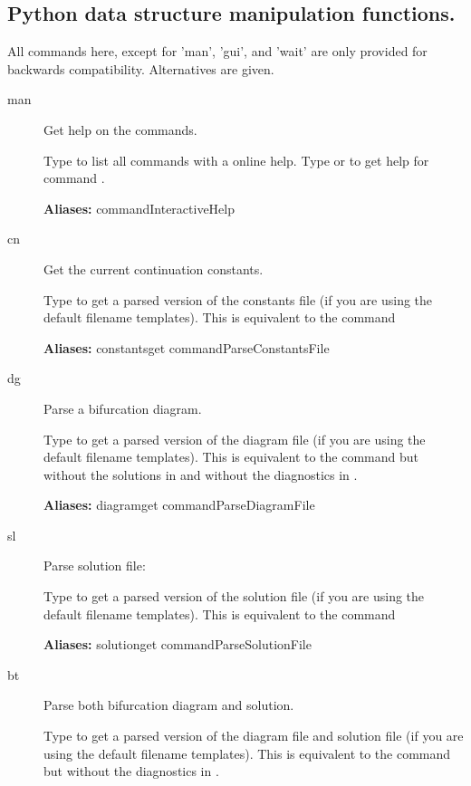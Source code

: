 \documentclass[12pt]{report}
\begin{document}
\subsection{Python data structure manipulation functions.}
\label{sec:clui_ref_python}
All commands here, except for 'man', 'gui', and 'wait' are only
provided for backwards compatibility. Alternatives are given.
\begin{description}
\item[man]
Get help on the \AUTO commands.
    
    Type  to list all commands with a online help.
    Type  or  to get help for command .

\textbf{Aliases:} commandInteractiveHelp

\item[cn]
Get the current continuation constants.

    Type  to get a parsed version of the constants file
     (if you are using the default filename templates).
    This is equivalent to the command\\
    
\textbf{Aliases:} constantsget commandParseConstantsFile

\item[dg]
Parse a bifurcation diagram.

    Type  to get a parsed version of the diagram file 
    (if you are using the default filename templates).
    This is equivalent to the command  but without the
    solutions in  and without the diagnostics in .
    
\textbf{Aliases:} diagramget commandParseDiagramFile

\item[sl]
Parse solution file:

    Type  to get a parsed version of the solution file
     (if you are using the default filename templates).
    This is equivalent to the command\\
    
\textbf{Aliases:} solutionget commandParseSolutionFile

\item[bt]
Parse both bifurcation diagram and solution.

    Type  to get a parsed version of the diagram file 
    and solution file  (if you are using the default filename
    templates).
    This is equivalent to the command  but without the
    diagnostics in .
    

\end{description}
\end{document}

